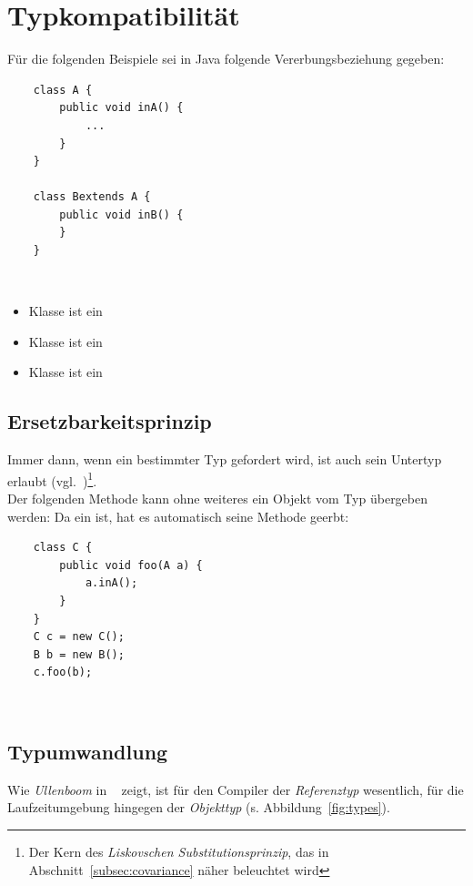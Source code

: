 \section{Typkompatibilität}




Für die folgenden Beispiele sei in Java folgende Vererbungsbeziehung gegeben:

\begin{verbatim}
    class A {
        public void inA() {
            ...
        }
    }

    class Bextends A {
        public void inB() {
        }
    }
\end{verbatim}\\

\begin{itemize}
    \item Klasse  ist ein 
    \item Klasse  ist ein 
    \item Klasse  ist ein 
\end{itemize}

\subsection{Ersetzbarkeitsprinzip}

Immer dann, wenn ein bestimmter Typ gefordert wird, ist auch sein Untertyp erlaubt (vgl.~\cite[466]{Ull23})\footnote{
Der Kern des \textit{Liskovschen Substitutionsprinzip}, das in Abschnitt~\ref{subsec:covariance} näher beleuchtet wird
}.\\

\noindent
Der folgenden Methode kann ohne weiteres ein Objekt vom Typ  übergeben werden: Da  ein  ist,
hat es automatisch seine Methode  geerbt:

\begin{verbatim}
    class C {
        public void foo(A a) {
            a.inA();
        }
    }
    C c = new C();
    B b = new B();
    c.foo(b);
\end{verbatim}\\

\subsection{Typumwandlung}

Wie \textit{Ullenboom} in ~\cite[467 f.]{Ull23} zeigt, ist für den Compiler der \textit{Referenztyp} wesentlich, für die Laufzeitumgebung hingegen der \textit{Objekttyp} (s. Abbildung~\ref{fig:types}).\\

